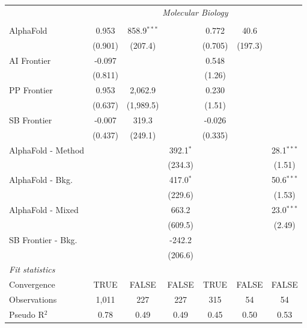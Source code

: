 \begin{tabular}{lcccccc}
 & \multicolumn{6}{c}{\textit{Molecular Biology}} \\ \\
   AlphaFold          & 0.953   & 858.9$^{***}$ &             & 0.772   & 40.6    &   \\   
                      & (0.901) & (207.4)       &             & (0.705) & (197.3) &   \\   
   AI Frontier        & -0.097  &               &             & 0.548   &         &   \\   
                      & (0.811) &               &             & (1.26)  &         &   \\   
   PP Frontier        & 0.953   & 2,062.9       &             & 0.230   &         &   \\   
                      & (0.637) & (1,989.5)     &             & (1.51)  &         &   \\   
   SB Frontier        & -0.007  & 319.3         &             & -0.026  &         &   \\   
                      & (0.437) & (249.1)       &             & (0.335) &         &   \\   
   AlphaFold - Method &         &               & 392.1$^{*}$ &         &         & 28.1$^{***}$\\   
                      &         &               & (234.3)     &         &         & (1.51)\\   
   AlphaFold - Bkg.   &         &               & 417.0$^{*}$ &         &         & 50.6$^{***}$\\   
                      &         &               & (229.6)     &         &         & (1.53)\\   
   AlphaFold - Mixed  &         &               & 663.2       &         &         & 23.0$^{***}$\\   
                      &         &               & (609.5)     &         &         & (2.49)\\   
   SB Frontier - Bkg. &         &               & -242.2      &         &         &   \\   
                      &         &               & (206.6)     &         &         &   \\   
   \midrule
   \emph{Fit statistics}\\
   Convergence        &TRUE     & FALSE         & FALSE       & TRUE    & FALSE   & FALSE\\  
   Observations       & 1,011   & 227           & 227         & 315     & 54      & 54\\  
   Pseudo R$^2$       & 0.78    & 0.49          & 0.49        & 0.45    & 0.50    & 0.53\\  
   

\end{tabular}
